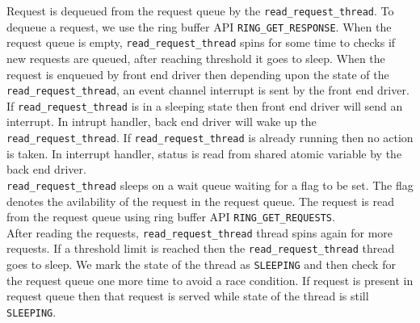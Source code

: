 Request is dequeued from the request queue by the \texttt{read\_request\_thread}. To dequeue a request, we use the ring buffer API \texttt{RING\_GET\_RESPONSE}. When the request queue is empty, \texttt{read\_request\_thread} spins for some time to checks if new requests are queued, after reaching threshold it goes to sleep. When the request is enqueued by front end driver then depending upon the state of the \texttt{read\_request\_thread}, an event channel interrupt is sent by the front end driver. If \texttt{read\_request\_thread} is in a sleeping state then front end driver will send an interrupt. In intrupt handler, back end driver will wake up the \texttt{read\_request\_thread}. If \texttt{read\_request\_thread} is already running then no action is taken. In interrupt handler, status is read from shared atomic variable by the back end driver.
\\
\texttt{read\_request\_thread} sleeps on a wait queue waiting for a flag to be set. The flag denotes the avilability of the request in the request queue. The request is read from the request queue using ring buffer API \texttt{RING\_GET\_REQUESTS}.
\\
After reading the requests, \texttt{read\_request\_thread} thread spins again for more requests. If a threshold limit is reached then the \texttt{read\_request\_thread} thread goes to sleep. We mark the state of the thread as \texttt{SLEEPING} and then check for the request queue one more time to avoid a race condition. If request is present in request queue then that request is served while state of the thread is still \texttt{SLEEPING}.

